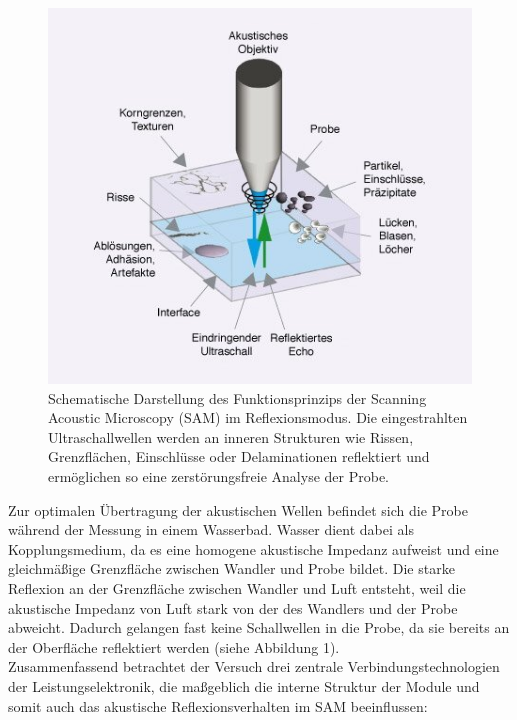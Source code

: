  \newpage
\vspace{0.2cm}
\begin{figure}
    \centering
    \includegraphics[scale=0.8]{Bilder/samtheorie}
    \caption{Schematische Darstellung des Funktionsprinzips der Scanning Acoustic Microscopy (SAM) im Reflexionsmodus. Die eingestrahlten Ultraschallwellen werden an inneren Strukturen wie Rissen, Grenzflächen, Einschlüsse oder Delaminationen reflektiert und ermöglichen so eine zerstörungsfreie Analyse der Probe.\cite{1}}
    \vspace{0.2cm}
    \label{Abb.1: Schematische Darstellung des Funktionsprinzips der Scanning Acoustic Microscopy (SAM) im Reflexionsmodus. Die eingestrahlten Ultraschallwellen werden an inneren Strukturen wie Rissen, Grenzflächen, Einschlüsse oder Delaminationen reflektiert und ermöglichen so eine zerstörungsfreie Analyse der Probe. }
\end{figure} 
\vspace{0.2cm}
Zur optimalen Übertragung der akustischen Wellen befindet sich die Probe während der Messung in einem Wasserbad. Wasser dient dabei als Kopplungsmedium, da es eine homogene akustische Impedanz aufweist und eine gleichmäßige Grenzfläche zwischen Wandler und Probe bildet.
Die starke Reflexion an der Grenzfläche zwischen Wandler und Luft entsteht, weil die akustische Impedanz von Luft stark von der des Wandlers und der Probe abweicht. Dadurch gelangen fast keine Schallwellen in die Probe, da sie bereits an der Oberfläche reflektiert werden (siehe Abbildung 1).\\
Zusammenfassend betrachtet der Versuch drei zentrale Verbindungstechnologien der Leistungselektronik, die maßgeblich die interne Struktur der Module und somit auch das akustische Reflexionsverhalten im SAM beeinflussen:\\

